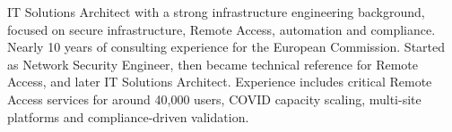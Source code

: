 
IT Solutions Architect with a strong infrastructure engineering background, focused on secure infrastructure, Remote Access, automation and compliance. Nearly 10 years of consulting experience for the European Commission. Started as Network Security Engineer, then became technical reference for Remote Access, and later IT Solutions Architect. Experience includes critical Remote Access services for around 40,000 users, COVID capacity scaling, multi-site platforms and compliance-driven validation.
